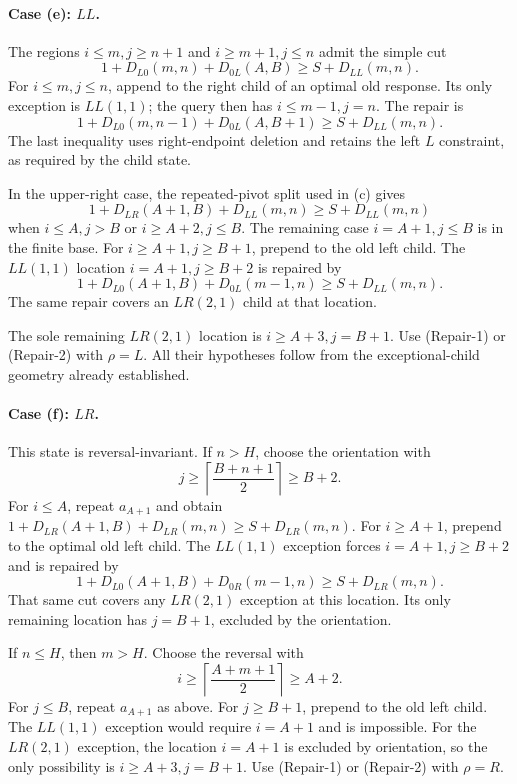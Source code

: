 \documentclass[11pt]{article}
\theoremstyle{definition}
\theoremstyle{remark}
\begin{document}
\paragraph{Case (e): $LL$.}
The regions $i\le m,j\ge n+1$ and $i\ge m+1,j\le n$ admit the simple cut
\[
 1+D_{L0}(m,n)+D_{0L}(A,B)\ge S+D_{LL}(m,n).
\]
For $i\le m,j\le n$, append to the right child of an optimal old response.
Its only exception is $LL(1,1)$; the query then has $i\le m-1,j=n$.
The repair is
\[
 1+D_{L0}(m,n-1)+D_{0L}(A,B+1)\ge S+D_{LL}(m,n).
\]
The last inequality uses right-endpoint deletion and retains the left $L$
constraint, as required by the child state.

In the upper-right case, the repeated-pivot split used in (c) gives
\[
 1+D_{LR}(A+1,B)+D_{LL}(m,n)\ge S+D_{LL}(m,n)
\]
when $i\le A,j>B$ or $i\ge A+2,j\le B$. The remaining case $i=A+1,j\le B$
is in the finite base. For $i\ge A+1,j\ge B+1$, prepend to the old left child.
The $LL(1,1)$ location $i=A+1,j\ge B+2$ is repaired by
\[
 1+D_{L0}(A+1,B)+D_{0L}(m-1,n)\ge S+D_{LL}(m,n).
\]
The same repair covers an $LR(2,1)$ child at that location.

The sole remaining $LR(2,1)$ location is $i\ge A+3,j=B+1$.
Use (Repair-1) or (Repair-2) with $\rho=L$. All their hypotheses follow
from the exceptional-child geometry already established.

\paragraph{Case (f): $LR$.}
This state is reversal-invariant. If $n>H$, choose the orientation with
\[
 j\ge\left\lceil\frac{B+n+1}{2}\right\rceil\ge B+2.
\]
For $i\le A$, repeat $a_{A+1}$ and obtain
$1+D_{LR}(A+1,B)+D_{LR}(m,n)\ge S+D_{LR}(m,n)$.
For $i\ge A+1$, prepend to the optimal old left child. The $LL(1,1)$ exception
forces $i=A+1,j\ge B+2$ and is repaired by
\[
 1+D_{L0}(A+1,B)+D_{0R}(m-1,n)\ge S+D_{LR}(m,n).
\]
That same cut covers any $LR(2,1)$ exception at this location. Its only
remaining location has $j=B+1$, excluded by the orientation.

If $n\le H$, then $m>H$. Choose the reversal with
\[
 i\ge\left\lceil\frac{A+m+1}{2}\right\rceil\ge A+2.
\]
For $j\le B$, repeat $a_{A+1}$ as above. For $j\ge B+1$, prepend to the old
left child. The $LL(1,1)$ exception would require $i=A+1$ and is impossible.
For the $LR(2,1)$ exception, the location $i=A+1$ is excluded by
orientation, so the only possibility is $i\ge A+3,j=B+1$.
Use (Repair-1) or (Repair-2) with $\rho=R$.
\end{document}

